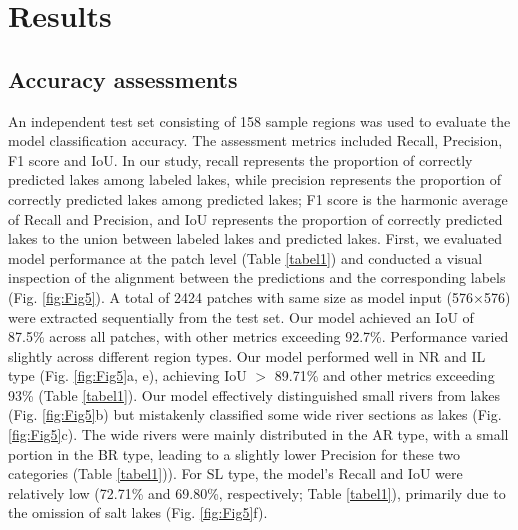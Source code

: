 \documentclass[preprint,12pt,authoryear]{elsarticle}
\begin{document}
\section{Results}
\label{sec3}

\subsection{Accuracy assessments}
\label{subsec31}

An independent test set consisting of 158 sample regions was used to evaluate the model classification accuracy. The assessment metrics included Recall, Precision, F1 score and IoU. In our study, recall represents the proportion of correctly predicted lakes among labeled lakes, while precision represents the proportion of correctly predicted lakes among predicted lakes; F1 score is the harmonic average of Recall and Precision, and IoU represents the proportion of correctly predicted lakes to the union between labeled lakes and predicted lakes. First, we evaluated model performance at the patch level (Table \ref{tabel1}) and conducted a visual inspection of the alignment between the predictions and the corresponding labels (Fig. \ref{fig:Fig5}). A total of 2424 patches with same size as model input (576×576) were extracted sequentially from the test set. Our model achieved an IoU of 87.5\% across all patches, with other metrics exceeding 92.7\%. Performance varied slightly across different region types. Our model performed well in NR and IL type (Fig. \ref{fig:Fig5}a, e), achieving IoU $>$ 89.71\% and other metrics exceeding 93\% (Table \ref{tabel1}). Our model effectively distinguished small rivers from lakes (Fig. \ref{fig:Fig5}b) but mistakenly classified some wide river sections as lakes (Fig. \ref{fig:Fig5}c). The wide rivers were mainly distributed in the AR type, with a small portion in the BR type, leading to a slightly lower Precision for these two categories (Table \ref{tabel1})). For SL type, the model’s Recall and IoU were relatively low (72.71\% and 69.80\%, respectively; Table \ref{tabel1}), primarily due to the omission of salt lakes (Fig. \ref{fig:Fig5}f).
\end{document}

